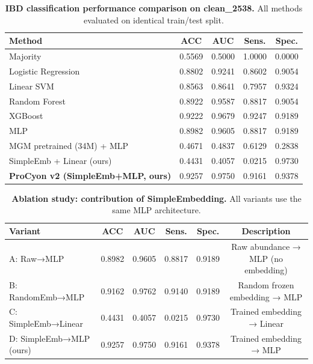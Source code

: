 \begin{table}[t]
\centering
\caption{\textbf{IBD classification performance comparison on clean\_2538.}
All methods evaluated on identical train/test split.}
\label{tab:baselines}
\begin{tabular}{lcccc}
\toprule
\textbf{Method} & \textbf{ACC} & \textbf{AUC} & \textbf{Sens.} & \textbf{Spec.} \\
\midrule
  Majority & 0.5569 & 0.5000 & 1.0000 & 0.0000 \\
  Logistic Regression & 0.8802 & 0.9241 & 0.8602 & 0.9054 \\
  Linear SVM & 0.8563 & 0.8641 & 0.7957 & 0.9324 \\
  Random Forest & 0.8922 & 0.9587 & 0.8817 & 0.9054 \\
  XGBoost & 0.9222 & 0.9679 & 0.9247 & 0.9189 \\
  MLP & 0.8982 & 0.9605 & 0.8817 & 0.9189 \\
  MGM pretrained (34M) + MLP & 0.4671 & 0.4837 & 0.6129 & 0.2838 \\
  SimpleEmb + Linear (ours) & 0.4431 & 0.4057 & 0.0215 & 0.9730 \\
  \textbf{ProCyon v2 (SimpleEmb+MLP, ours)} & 0.9257 & 0.9750 & 0.9161 & 0.9378 \\
\bottomrule
\end{tabular}
\end{table}
\begin{table}[t]
\centering
\caption{\textbf{Ablation study: contribution of SimpleEmbedding.}
All variants use the same MLP architecture.}
\label{tab:ablation}
\begin{tabular}{lccccc}
\toprule
\textbf{Variant} & \textbf{ACC} & \textbf{AUC} & \textbf{Sens.} & \textbf{Spec.} & \textbf{Description} \\
\midrule
  A: Raw→MLP & 0.8982 & 0.9605 & 0.8817 & 0.9189 & Raw abundance → MLP (no embedding) \\
  B: RandomEmb→MLP & 0.9162 & 0.9762 & 0.9140 & 0.9189 & Random frozen embedding → MLP \\
  C: SimpleEmb→Linear & 0.4431 & 0.4057 & 0.0215 & 0.9730 & Trained embedding → Linear \\
  D: SimpleEmb→MLP (ours) & 0.9257 & 0.9750 & 0.9161 & 0.9378 & Trained embedding → MLP \\
\bottomrule
\end{tabular}
\end{table}
